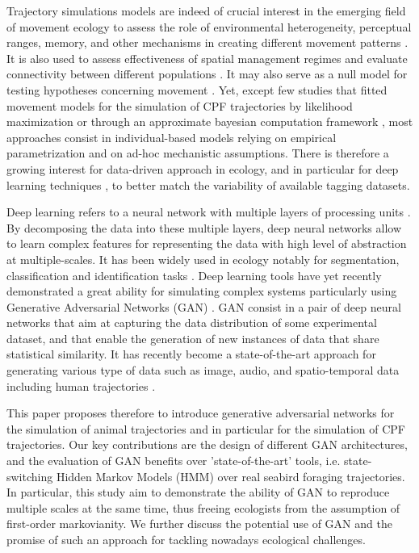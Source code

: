 \documentclass{article}
\begin{document}
Trajectory simulations models are indeed of crucial interest in the emerging field of movement ecology to assess the role of environmental heterogeneity, perceptual ranges, memory, and other mechanisms in creating different movement patterns \citep{avgar_empirically_2013}. It is also used to assess effectiveness of spatial management regimes and evaluate connectivity between different populations \citep{palmer_introducing_2011,deangelis_individual-based_2014}. It may also serve as a null model for testing hypotheses concerning movement \citep{michelot_estimation_2017}. Yet, except few studies that fitted movement models for the simulation of CPF trajectories by likelihood maximization or through an approximate bayesian computation framework \citep{michelot_estimation_2017,zhang_linking_2017}, most approaches consist in individual-based models relying on empirical parametrization and on ad-hoc mechanistic assumptions. There is therefore a growing interest for data-driven approach in ecology, and in particular for deep learning techniques \citep{malde_machine_2020}, to better match the variability of available tagging datasets. 

Deep learning refers to a neural network with multiple layers of processing units \citep{lecun_deep_2015}. By decomposing the data into these multiple layers, deep neural networks allow to learn complex features for representing the data with high level of abstraction at multiple-scales. It has been widely used in ecology notably for segmentation, classification and identification tasks \citep{christin_applications_2019}. Deep learning tools have yet recently demonstrated a great ability for simulating complex systems particularly using Generative Adversarial Networks (GAN) \citep{goodfellow_generative_2014}. GAN consist in a pair of deep neural networks that aim at capturing the data distribution of some experimental dataset, and that enable the generation of new instances of data that share statistical similarity. It has recently become a state-of-the-art approach for generating various type of data such as image, audio, and spatio-temporal data including human trajectories \citep{cao_recent_2019,gao_generative_2020}.

This paper proposes therefore to introduce generative adversarial networks for the simulation of animal trajectories and in particular for the simulation of CPF trajectories. Our key contributions are the design of different GAN architectures, and the evaluation of GAN benefits over 'state-of-the-art' tools, i.e. state-switching Hidden Markov Models (HMM) over real seabird foraging trajectories. In particular, this study aim to demonstrate the ability of GAN to reproduce multiple scales at the same time, thus freeing ecologists from the assumption of first-order markovianity. We further discuss the potential use of GAN and the promise of such an approach for tackling nowadays ecological challenges.
\end{document}
